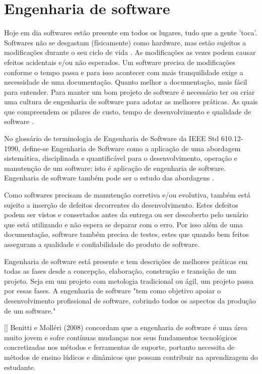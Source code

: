 \section[Engenharia de software]{Engenharia de software}
Hoje em dia softwares estão presente em todos os lugares, tudo que a gente 'toca'. Softwares não se desgastam (físicamente) como hardware, mas estão sujeitos a modificações durante o seu ciclo de vida \cite{Silva_filho}. As modificações as vezes podem causar efeitos acidentais e/ou não esperados. Um software precisa de modificações conforme o tempo passa e para isso acontecer com mais tranquilidade exige a necessidade de uma documentação. Quanto melhor a documentação, mais fácil para entender. Para manter um bom projeto de software é necessário ter ou criar uma cultura de engenharia de software para adotar as melhores práticas. As quais que compreendem os pilares de custo, tempo de desenvolvimento e qualidade de software \cite{Silva_filho}.

No glossário de terminologia de Engenharia de Software da IEEE Std 610.12-1990, define-se Engenharia de Software como a aplicação de uma abordagem sistemática, disciplinada e quantificável para o desenvolvimento, operação e manutenção de um software; isto é aplicação de engenharia de software. Engenharia de software também pode ser o estudo das abordagens \cite{ieeeTerminology}.

Como softwares precisam de manutenção corretiva e/ou evolutiva, também está sujeito a inserção de defeitos decorrentes do desenvolvimento. Estes defeitos podem ser vistos e consertados antes da entrega \cite{Silva_filho} ou ser descoberto pelo usuário que está utilizando e não espera se deparar com o erro. Por isso além de uma documentação, software também precisa de testes, estes que quando bem feitos asseguram a qualidade e confiabilidade do produto de software.

Engenharia de software está presente e tem descrições de melhores práticas em todas as fases desde a concepção, elaboração, construção e transição de um projeto. Seja em um projeto com metologia tradicional ou ágil, um projeto passa por essas fases. A engenharia de software "tem como objetivo apoiar o desenvolvimento profissional de software, cobrindo todos os aspectos da produção de um software."

[\cite{sucessoJogoEngSoft}] Benitti e Molléri (2008) concordam que a engenharia de software é uma área muito jovem e sofre contínuas mudanças nos seus fundamentos tecnológicos concretizadas nos métodos e ferramentas de suporte, portanto necessita de métodos de ensino lúdicos e dinâmicos que possam contribuir na aprendizagem do estudante.


